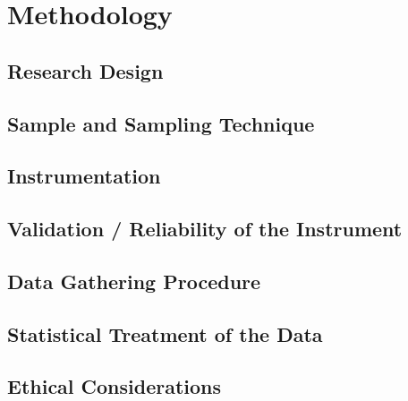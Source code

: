 \documentclass[../../1_thesis]{subfiles}
\begin{document}
\chapter{Methodology}

\section{Research Design}

\section{Sample and Sampling Technique}

\section{Instrumentation}

\section{Validation / Reliability of the Instrument}

\section{Data Gathering Procedure}

\section{Statistical Treatment of the Data}

\section{Ethical Considerations}
\end{document}
